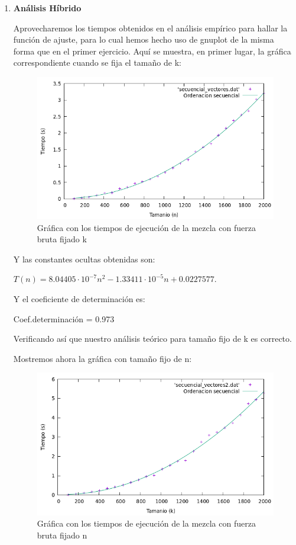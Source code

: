 \documentclass[10pt,a4paper]{article}
\begin{document}
\begin{enumerate}
	\item \textbf{Análisis Híbrido}
	
	Aprovecharemos los tiempos obtenidos en el análisis empírico para hallar la función de ajuste, para lo cual hemos hecho uso de gnuplot de la misma forma que en el primer ejercicio. Aquí se muestra, en primer lugar, la gráfica correspondiente cuando se fija el tamaño de k:
	
	\begin{figure}[h!]
		\centering
		\includegraphics[scale=0.55]{./Images/Grafica_eje2_fijoksec.png}
		\caption{Gráfica con los tiempos de ejecución de la mezcla con fuerza bruta fijado k}
	\end{figure}

	Y las constantes ocultas obtenidas son:
	
	\( T(n) = 8.04405\cdot 10^{-7} n^2 - 1.33411\cdot 10^{-5}n + 0.0227577\).
	
	Y el coeficiente de determinación es:
	
	Coef.determinación = 0.973
	
	Verificando así que nuestro análisis teórico para tamaño fijo de k es correcto.

	Mostremos ahora la gráfica con tamaño fijo de n:
	
	
	\begin{figure}[h!]
		\centering
		\includegraphics[scale=0.55]{./Images/Grafica_eje2_fijonsec.png}
		\caption{Gráfica con los tiempos de ejecución de la mezcla con fuerza bruta fijado n}
	\end{figure}


\end{enumerate}
\end{document}
